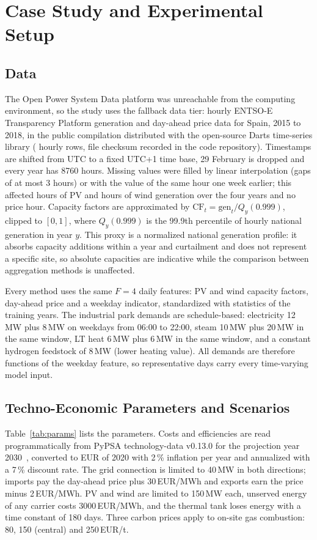 \documentclass[journal]{IEEEtran}
\begin{document}
\section{Case Study and Experimental Setup}\label{sec:setup}

\subsection{Data}
The Open Power System Data platform was unreachable from the computing environment, so the study uses the fallback data tier: hourly ENTSO-E Transparency Platform generation and day-ahead price data for Spain, 2015 to 2018, in the public compilation distributed with the open-source Darts time-series library (\DataRows{} hourly rows, file checksum recorded in the code repository). Timestamps are shifted from UTC to a fixed UTC+1 time base, 29 February is dropped and every year has 8760 hours. Missing values were filled by linear interpolation (gaps of at most 3 hours) or with the value of the same hour one week earlier; this affected \FilledPVTotal{} hours of PV and \FilledWindTotal{} hours of wind generation over the four years and no price hour. Capacity factors are approximated by $\mathrm{CF}_t=\mathrm{gen}_t/Q_y(0.999)$, clipped to $[0,1]$, where $Q_y(0.999)$ is the 99.9th percentile of hourly national generation in year $y$. This proxy is a normalized national generation profile: it absorbs capacity additions within a year and curtailment and does not represent a specific site, so absolute capacities are indicative while the comparison between aggregation methods is unaffected.

Every method uses the same $F=4$ daily features: PV and wind capacity factors, day-ahead price and a weekday indicator, standardized with statistics of the training years. The industrial park demands are schedule-based: electricity 12\,MW plus 8\,MW on weekdays from 06:00 to 22:00, steam 10\,MW plus 20\,MW in the same window, LT heat 6\,MW plus 6\,MW in the same window, and a constant hydrogen feedstock of 8\,MW (lower heating value). All demands are therefore functions of the weekday feature, so representative days carry every time-varying model input.

\subsection{Techno-Economic Parameters and Scenarios}
Table~\ref{tab:params} lists the parameters. Costs and efficiencies are read programmatically from PyPSA technology-data v0.13.0 for the projection year 2030~\cite{pypsa2025technologydata}, converted to EUR of 2020 with 2\,\% inflation per year and annualized with a 7\,\% discount rate. The grid connection is limited to 40\,MW in both directions; imports pay the day-ahead price plus 30\,EUR/MWh and exports earn the price minus 2\,EUR/MWh. PV and wind are limited to 150\,MW each, unserved energy of any carrier costs 3000\,EUR/MWh, and the thermal tank loses energy with a time constant of 180 days. Three carbon prices apply to on-site gas combustion: 80, 150 (central) and 250\,EUR/t.
\end{document}
